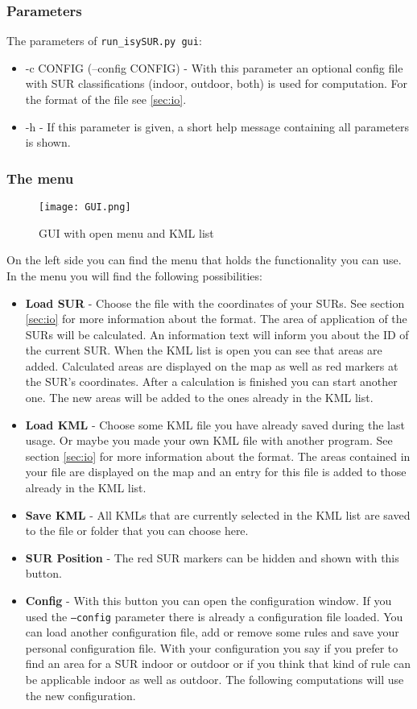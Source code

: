 \documentclass[11pt,fleqn]{book} %
\begin{document}
\subsubsection{Parameters}
The parameters of \texttt{run\_isySUR.py gui}:
\begin{itemize}
	\item -c CONFIG (--config CONFIG) - With this parameter an optional config file with SUR classifications (indoor, outdoor, both) is used for computation. For the format of the file see \ref{sec:io}.
	\item -h - If this parameter is given, a short help message containing all parameters is shown.
\end{itemize}

\subsubsection{The menu}
\begin{figure}
\centering
\texttt{[image: GUI.png]}
\caption{GUI with open menu and KML list}
\end{figure}
On the left side you can find the menu that holds the functionality you can use. In the menu you will find the following possibilities:
\begin{itemize}
	\item \textbf{Load SUR} - Choose the file with the coordinates of your SURs. See section \ref{sec:io} for more information about the format. The area of application of the SURs will be calculated. An information text will inform you about the ID of the current SUR. When the KML list is open you can see that areas are added. Calculated areas are displayed on the map as well as red markers at the SUR's coordinates. After a calculation is finished you can start another one. The new areas will be added to the ones already in the KML list.
	\item \textbf{Load KML} - Choose some KML file you have already saved during the last usage. Or maybe you made your own KML file with another program. See section \ref{sec:io} for more information about the format. The areas contained in your file are displayed on the map and an entry for this file is added to those already in the KML list.
	\item \textbf{Save KML} - All KMLs that are currently selected in the KML list are saved to the file or folder that you can choose here.
	\item \textbf{SUR Position} - The red SUR markers can be hidden and shown with this button.
	\item \textbf{Config} - With this button you can open the configuration window. If you used the \texttt{--config} parameter there is already a configuration file loaded. You can load another configuration file, add or remove some rules and save your personal configuration file. With your configuration you say if you prefer to find an area for a SUR indoor or outdoor or if you think that kind of rule can be applicable indoor as well as outdoor. The following computations will use the new configuration.
\end{itemize}
\end{document}
